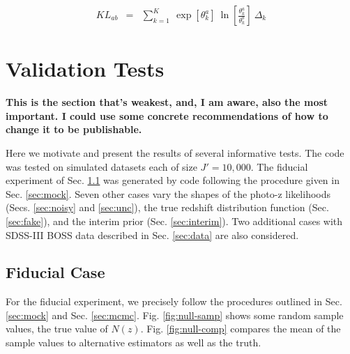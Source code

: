 \documentclass[preprint]{aastex}
\begin{document}
\begin{eqnarray}
\label{eq:kl}
KL_{ab} &=& \sum_{k=1}^{K}\ \exp[\theta_{k}^{a}]\ 
\ln\left[\frac{\theta_{k}^{a}}{\theta_{k}^{b}}\right]\ \Delta_{k}
\end{eqnarray}

\clearpage
\section{Validation Tests}
\label{sec:valid}

\textbf{This is the section that's weakest, and, I am aware, also the most 
important.  I could use some concrete recommendations of how to change it to be 
publishable.}

Here we motivate and present the results of several informative tests.  The 
code was tested on simulated datasets each of size $J'=10,000$.  The fiducial 
experiment of Sec. \ref{sec:null} was generated by code following the procedure 
given in Sec. \ref{sec:mock}.  Seven other cases vary the shapes of the photo-z 
likelihoods (Secs. \ref{sec:noisy} and \ref{sec:unc}), the true redshift 
distribution function (Sec. \ref{sec:fake}), and the interim prior (Sec. 
\ref{sec:interim}).  Two additional cases with SDSS-III BOSS data described in 
Sec. \ref{sec:data} are also considered.

\clearpage
\subsection{Fiducial Case}
\label{sec:null}

For the fiducial experiment, we precisely follow the procedures outlined in 
Sec. \ref{sec:mock} and Sec. \ref{sec:mcmc}.  Fig. \ref{fig:null-samp} shows 
some random sample values, the true value of $N(z)$.  Fig. \ref{fig:null-comp} 
compares the mean of the sample values to alternative estimators as well as the 
truth.
\end{document}
